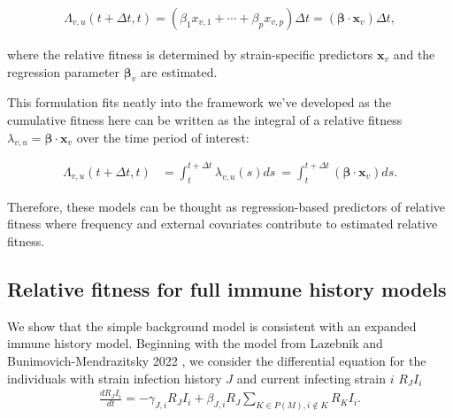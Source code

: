 \documentclass[11pt,oneside,letterpaper]{article}
\renewcommand{\vec}[1]{\boldsymbol{#1}}
\begin{document}
\begin{align*}
    \Lambda_{v,u}(t + \Delta t,t) = (\beta_{1} x_{v,1} + \cdots + \beta_{p} x_{v, p})\Delta t = (\vec{\beta} \cdot \vec{x}_{v}) \Delta t,
\end{align*}

where the relative fitness is determined by strain-specific predictors $\vec{x}_{v}$ and the regression parameter $\vec{\beta}_{v}$ are estimated.

This formulation fits neatly into the framework we've developed as the cumulative fitness here can be written as the integral of a relative fitness $\lambda_{v, u} =  \vec{\beta} \cdot \vec{x}_{v}$ over the time period of interest:

\begin{align*}
    \Lambda_{v,u}(t + \Delta t,t)  &= \int_{t}^{t+\Delta t} \lambda_{v,u}(s)ds\ = \int_{t}^{t + \Delta t} (\vec{\beta} \cdot \vec{x}_{v}) ds.
\end{align*}

Therefore, these models can be thought as regression-based predictors of relative fitness where frequency and external covariates contribute to estimated relative fitness.

\subsection{Relative fitness for full immune history models}\label{ssec:full_immune_history}


We show that the simple background model is consistent with an expanded immune history model.
Beginning with the model from Lazebnik and Bunimovich-Mendrazitsky 2022 \cite{Lazebnik2022}, we consider the differential equation for the individuals with strain infection history $J$ and current infecting strain $i$ $R_{J}I_{i}$
\begin{align*}
\frac{dR_{J} I_{i}}{dt} = - \gamma_{J, i} R_{J} I_{i} + \beta_{J, i} R_{J} \sum_{K \in P(M), i\notin K} R_{K}I_{i}.
\end{align*}
\end{document}
